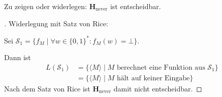 Zu zeigen oder widerlegen: $\mathbf{H}_\text{never}$ ist entscheidbar.

\begin{proof}[\unskip\nopunct]
Widerlegung mit Satz von Rice:

Sei $\mathcal{S}_1 = \{f_M \mid \forall w \in \{0, 1\}^\ast : f_M(w) = \bot\}$.

Dann ist
\begin{align*}
	L(\mathcal{S}_1) &= \{ \langle M \rangle \mid M \text{ berechnet eine
		Funktion aus $\mathcal{S}_1$}\} \\
	&= \{ \langle M \rangle \mid M \text{ hält auf keiner Eingabe}\}
\end{align*}
Nach dem Satz von Rice ist $\mathbf{H}_\text{never}$ damit nicht entscheidbar.
\end{proof}
